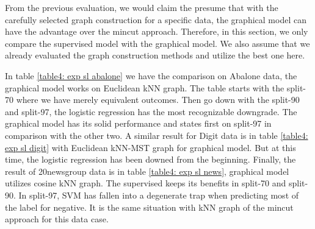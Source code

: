 From the previous evaluation, we would claim the presume that with the carefully selected graph construction for a specific data, the graphical model can have the advantage over the mincut approach. Therefore, in this section, we only compare the supervised model with the graphical model. We also assume that we already evaluated the graph construction methods and utilize the best one here. 

In table \ref{table4: exp sl abalone} we have the comparison on Abalone data, the graphical model works on Euclidean kNN graph. The table starts with the split-70 where we have merely equivalent outcomes. Then go down with the split-90 and split-97, the logistic regression has the most recognizable downgrade. The graphical model has its solid performance and states first on split-97 in comparison with the other two. A similar result for Digit data is in table \ref{table4: exp sl digit} with Euclidean kNN-MST graph for graphical model. But at this time, the logistic regression has been downed from the beginning. Finally, the result of 20newsgroup data is in table \ref{table4: exp sl news}, graphical model utilizes cosine kNN graph. The supervised keeps its benefits in split-70 and split-90. In split-97, SVM has fallen into a degenerate trap when predicting most of the label for negative. It is the same situation with kNN graph of the mincut approach for this data case.

\pagebreak











